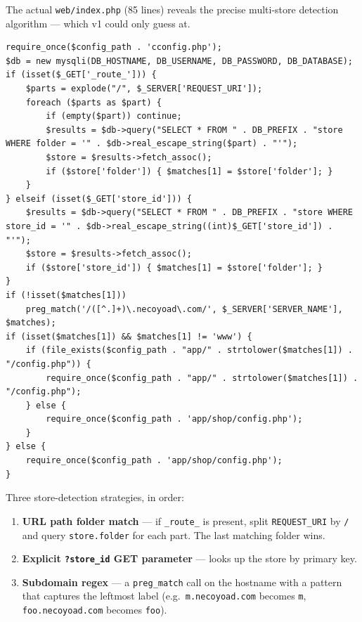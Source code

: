 \documentclass[11pt,a4paper]{article}
\begin{document}
The actual \texttt{web/index.php} (85 lines) reveals the precise
multi-store detection algorithm --- which v1 could only guess at.

\begin{lstlisting}[caption={Store detection algorithm, abridged from \texttt{web/index.php}.},label={lst:store-detection}]
require_once($config_path . 'cconfig.php');
$db = new mysqli(DB_HOSTNAME, DB_USERNAME, DB_PASSWORD, DB_DATABASE);
if (isset($_GET['_route_'])) {
    $parts = explode("/", $_SERVER['REQUEST_URI']);
    foreach ($parts as $part) {
        if (empty($part)) continue;
        $results = $db->query("SELECT * FROM " . DB_PREFIX . "store WHERE folder = '" . $db->real_escape_string($part) . "'");
        $store = $results->fetch_assoc();
        if ($store['folder']) { $matches[1] = $store['folder']; }
    }
} elseif (isset($_GET['store_id'])) {
    $results = $db->query("SELECT * FROM " . DB_PREFIX . "store WHERE store_id = '" . $db->real_escape_string((int)$_GET['store_id']) . "'");
    $store = $results->fetch_assoc();
    if ($store['store_id']) { $matches[1] = $store['folder']; }
}
if (!isset($matches[1]))
    preg_match('/([^.]+)\.necoyoad\.com/', $_SERVER['SERVER_NAME'], $matches);
if (isset($matches[1]) && $matches[1] != 'www') {
    if (file_exists($config_path . "app/" . strtolower($matches[1]) . "/config.php")) {
        require_once($config_path . "app/" . strtolower($matches[1]) . "/config.php");
    } else {
        require_once($config_path . 'app/shop/config.php');
    }
} else {
    require_once($config_path . 'app/shop/config.php');
}
\end{lstlisting}

Three store-detection strategies, in order:

\begin{enumerate}[leftmargin=1.6em,itemsep=2pt]
  \item \textbf{URL path folder match} --- if \texttt{\_route\_} is
        present, split \texttt{REQUEST\_URI} by \texttt{/} and query
        \texttt{store.folder} for each part. The last matching
        folder wins.
  \item \textbf{Explicit \texttt{?store\_id} GET parameter} ---
        looks up the store by primary key.
  \item \textbf{Subdomain regex} --- a \texttt{preg\_match} call on
        the hostname with a pattern that captures the leftmost label
        (e.g.\ \texttt{m.necoyoad.com} becomes \texttt{m},
        \texttt{foo.necoyoad.com} becomes \texttt{foo}).
\end{enumerate}
\end{document}
